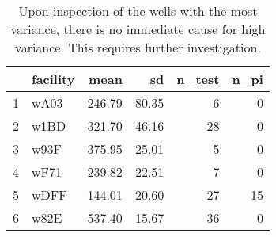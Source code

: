 \begin{table}[h]
\centering
\begin{tabular}{rlrrrr}
  \hline
 & facility & mean & sd & n\_test & n\_pi \\ 
  \hline
1 & wA03 & 246.79 & 80.35 &   6 &   0 \\ 
  2 & w1BD & 321.70 & 46.16 &  28 &   0 \\ 
  3 & w93F & 375.95 & 25.01 &   5 &   0 \\ 
  4 & wF71 & 239.82 & 22.51 &   7 &   0 \\ 
  5 & wDFF & 144.01 & 20.60 &  27 &  15 \\ 
  6 & w82E & 537.40 & 15.67 &  36 &   0 \\ 
   \hline
\end{tabular}
\caption{Upon inspection of the wells with the most variance, there is no immediate cause for high variance. This requires further investigation.} 
\label{tab:well_summaries}
\end{table}
